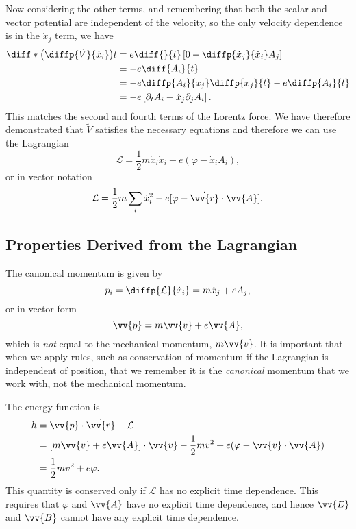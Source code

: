 \documentclass[fleqn]{NotesClass}
\newcommand*{\lagrangian}{\mathcal{L}}
\begin{document}
    Now considering the other terms, and remembering that both the scalar and vector potential are independent of the velocity, so the only velocity dependence is in the \(\dot{x}_j\) term, we have
    \begin{align}
        \diff*{\left( \diffp{\tilde{V}}{\dot{x}_i} \right)}{t} &= e\diff{}{t}\left[ 0 - \diffp{\dot{x}_j}{\dot{x}_i}A_j \right]\\
        &= -e\diff{A_i}{t}\\
        &= -e\diffp{A_i}{x_j}\diffp{x_j}{t} - e\diffp{A_i}{t}\\
        &= -e\left[ \partial_tA_i + \dot{x}_j\partial_j A_i \right].
    \end{align}
    This matches the second and fourth terms of the Lorentz force.
    We have therefore demonstrated that \(\tilde{V}\) satisfies the necessary equations and therefore we can use the Lagrangian
    \begin{equation}
        \lagrangian = \frac{1}{2}m\dot{x}_i\dot{x}_i - e\left( \varphi - \dot{x}_iA_i \right),
    \end{equation}
    or in vector notation
    \begin{equation}
        \lagrangian = \frac{1}{2}m\sum_i \dot{x}_i^2 - e[\varphi - \dot{\vv{r}} \cdot \vv{A}].
    \end{equation}
    
    \subsection{Properties Derived from the Lagrangian}
    The canonical momentum is given by
    \begin{equation}
        p_i = \diffp{\lagrangian}{\dot{x}_i} = m\dot{x}_j + eA_j,
    \end{equation}
    or in vector form
    \begin{equation}\label{eqn:canonical momentum EM}
        \vv{p} = m\vv{v} + e\vv{A},
    \end{equation}
    which is \emph{not} equal to the mechanical momentum, \(m\vv{v}\).
    It is important that when we apply rules, such as conservation of momentum if the Lagrangian is independent of position, that we remember it is the \emph{canonical} momentum that we work with, not the mechanical momentum.
    
    The energy function is
    \begin{align}
        h &= \vv{p}\cdot\dot{\vv{r}} - \lagrangian\\
        &= [m\vv{v} + e\vv{A}] \cdot \vv{v} - \frac{1}{2}mv^2 + e(\varphi - \vv{v}\cdot\vv{A})\\
        &= \frac{1}{2}mv^2 + e\varphi.\label{eqn:energy function EM}
    \end{align}
    This quantity is conserved only if \(\lagrangian\) has no explicit time dependence.
    This requires that \(\varphi\) and \(\vv{A}\) have no explicit time dependence, and hence \(\vv{E}\) and \(\vv{B}\) cannot have any explicit time dependence.
    
\end{document}
